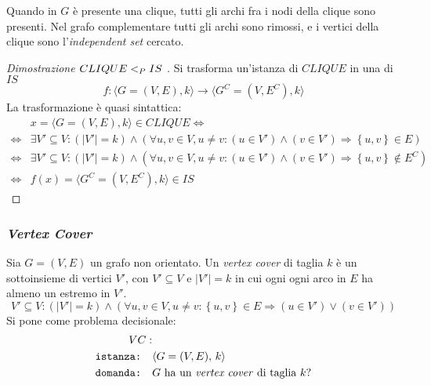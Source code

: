 Quando in $G$ è presente una clique, tutti gli archi fra i nodi della clique sono presenti. Nel grafo complementare tutti gli archi sono rimossi, e i vertici della clique sono l'\emph{independent set} cercato.
\begin{proof}[Dimostrazione $ CLIQUE <_P IS $ ]
Si trasforma un'istanza di $CLIQUE$ in una di $IS$
\begin{equation*}
    f : \langle G = (V,E), k \rangle  \to  \langle G^C = (V,E^C), k \rangle
\end{equation*}
La trasformazione è quasi sintattica:
\begin{align*}
    &
    x = \langle G = (V,E), k \rangle \in CLIQUE \Leftrightarrow
    \\
    \Leftrightarrow &
    \exists V' \subseteq V : 
    \left( |V'| = k \right)
    \wedge
    \left( 
        \forall u, v \in V, u \ne v :
        \left( u \in V' \right) \wedge \left( v \in V' \right)
        \Rightarrow
        \left\{ u,v \right\} \in E
    \right)
    \\
    \Leftrightarrow &
    \exists V' \subseteq V : 
    \left( |V'| = k \right)
    \wedge
    \left( 
        \forall u, v \in V, u \ne v :
        \left( u \in V' \right) \wedge \left( v \in V' \right)
        \Rightarrow
        \left\{ u,v \right\} \notin E^C
    \right)
    \\
    \Leftrightarrow &
    f(x) = \langle G^C = (V,E^C), k \rangle \in IS
\end{align*}
\end{proof}

\subsubsection{\emph{Vertex Cover}}

\begin{definition}
    \label{def:vertcov}
    Sia $G=(V,E)$ un grafo non orientato. Un \emph{vertex cover} di taglia $k$ è un sottoinsieme di vertici $V'$, con $V' \subseteq V$ e $|V'| = k$
    in cui ogni ogni arco in $E$ ha almeno un estremo in $V'$.
    \begin{equation*}
        V' \subseteq V : 
        \left( |V'| = k \right)
        \wedge
        \left( 
            \forall u, v \in V, u \ne v :
            \left\{ u,v \right\} \in E
            \Rightarrow
            \left( u \in V' \right) \vee \left( v \in V' \right)
        \right)
    \end{equation*}
Si pone come problema decisionale:
\begin{align*}
    VC: & \\
    \texttt{istanza:} \quad & \langle G=(V,E), \, k \rangle \\
    \texttt{domanda:} \quad & G \text{ ha un \emph{vertex cover} di taglia } k?
\end{align*}
\end{definition}

